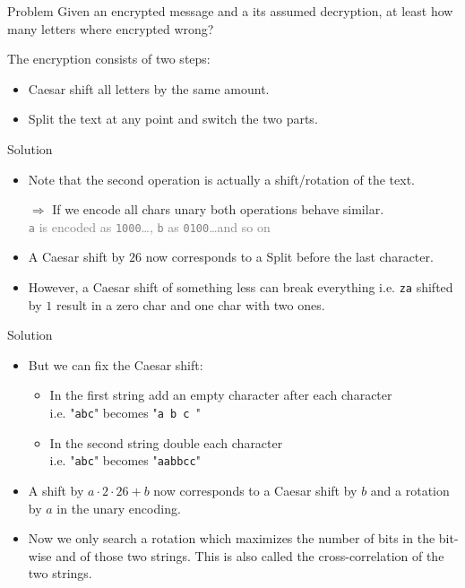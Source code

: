 \begin{slide}
	\begin{block}{Problem}
		Given an encrypted message and a its assumed decryption, at least how many letters where encrypted wrong?
		
		The encryption consists of two steps:
		\begin{itemize}
			\item Caesar shift all letters by the same amount.
			\item Split the text at any point and switch the two parts.
		\end{itemize}
	\end{block}
	\pause
	\begin{block}{Solution}
		\begin{itemize}
			\item Note that the second operation is actually a shift/rotation of the text.
			\item[$\Rightarrow$] If we encode all chars unary both operations behave similar.\\
			\textcolor{gray}{\texttt{a} is encoded as \texttt{1000}\dots, \texttt{b} as \texttt{0100}\dots and so on}
			\item A Caesar shift by $26$ now corresponds to a Split before the last character.
			\pause
			\item However, a Caesar shift of something less can break everything i.e. \texttt{za} shifted by $1$ result in a zero char and one char with two ones. 
		\end{itemize}
	\end{block}
\end{slide}

\begin{slide}
	\begin{block}{Solution}
		\begin{itemize}
			\item But we can fix the Caesar shift:
			\begin{itemize}
				\item In the first string add an empty character after each character\\i.e. "\texttt{abc}" becomes "\texttt{a b c }"
				\item In the second string double each character\\i.e. "\texttt{abc}" becomes "\texttt{aabbcc}"
			\end{itemize}
			\item A shift by $a\cdot2\cdot26+b$ now corresponds to a Caesar shift by $b$ and a rotation by $a$ in the unary encoding.
			\pause
			\item Now we only search a rotation which maximizes the number of bits in the bit-wise and of those two strings.
			This is also called the cross-correlation of the two strings.
		\end{itemize}
	\end{block}
\end{slide}

